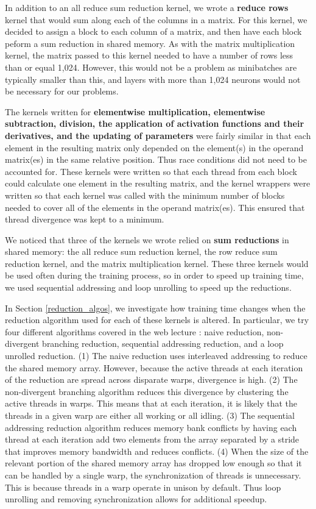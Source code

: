\documentclass[11pt,a4paper]{article}
\begin{document}
In addition to an all reduce sum reduction kernel, we wrote a \textbf{reduce rows} kernel that would sum along each of the columns in a matrix. For this kernel, we decided to assign a block to each column of a matrix, and then have each block peform a sum reduction in shared memory. As with the matrix multiplication kernel, the matrix passed to this kernel needed to have a number of rows less than or equal 1,024. However, this would not be a problem as minibatches are typically smaller than this, and layers with more than 1,024 neurons would not be necessary for our problems.

The kernels written for \textbf{elementwise multiplication, elementwise subtraction, division, the application of activation functions and their derivatives, and the updating of parameters} were fairly similar in that each element in the resulting matrix only depended on the element(s) in the operand matrix(es) in the same relative position. Thus race conditions did not need to be accounted for. These kernels were written so that each thread from each block could calculate one element in the resulting matrix, and the kernel wrappers were written so that each kernel was called with the minimum number of blocks needed to cover all of the elements in the operand matrix(es). This ensured that thread divergence was kept to a minimum. 

We noticed that three of the kernels we wrote relied on \textbf{sum reductions} in shared memory: the all reduce sum reduction kernel, the row reduce sum reduction kernel, and the matrix multiplication kernel. These three kernels would be used often during the training process, so in order to speed up training time, we used sequential addressing and loop unrolling to speed up the reductions. 

In Section \ref{reduction_algos}, we investigate how training time changes when the reduction algorithm used for each of these kernels is altered. In particular, we try four different algorithms covered in the web lecture \cite{choi_reductions}: naive reduction, non-divergent branching reduction, sequential addressing reduction, and a loop unrolled reduction. (1) The naive reduction uses interleaved addressing to reduce the shared memory array. However, because the active threads at each iteration of the reduction are spread across disparate warps, divergence is high. (2) The non-divergent branching algorithm reduces this divergence by clustering the active threads in warps. This means that at each iteration, it is likely that the threads in a given warp are either all working or all idling. (3) The sequential addressing reduction algorithm reduces memory bank conflicts by having each thread at each iteration add two elements from the array separated by a stride that improves memory bandwidth and reduces conflicts. (4) When the size of the relevant portion of the shared memory array has dropped low enough so that it can be handled by a single warp, the synchronization of threads is unnecessary. This is because threads in a warp operate in unison by default. Thus loop unrolling and removing synchronization allows for additional speedup.
\end{document}
